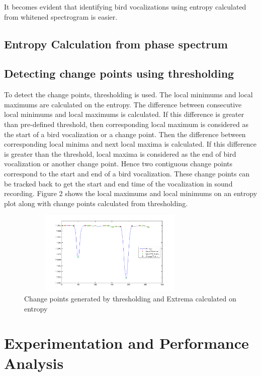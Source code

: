 \documentclass[a4paper]{article}
\begin{document}
It becomes evident that identifying bird vocalizations using entropy calculated from whitened spectrogram is easier.  



\subsection{Entropy Calculation from phase spectrum}



\subsection{Detecting change points using thresholding}

To detect the change points, thresholding is used. The local minimums and local maximums are calculated on the  entropy. The difference between consecutive local minimums and local maximums is calculated. If this difference is greater than pre-defined threshold, then corresponding local maximum is considered as the start of a bird vocalization or a change point. Then the difference between corresponding local minima and next local maxima is calculated. If this difference is greater than the threshold, local maxima is considered as the end of bird vocalization or another change point. Hence two contiguous change points correspond to the start and end of a bird vocalization. These change points can be tracked back to get the start and end time of the vocalization in sound recording. Figure 2 shows the local maximums and local minimums on an entropy plot along with change points calculated from thresholding.

\begin{figure}[!ht]
	\centering
	\includegraphics[width=9cm, height=4cm]{thresholding}
	\caption{ Change points generated by thresholding and Extrema calculated on entropy}   
\end{figure} 

   




\section{Experimentation and Performance Analysis}
\end{document}
